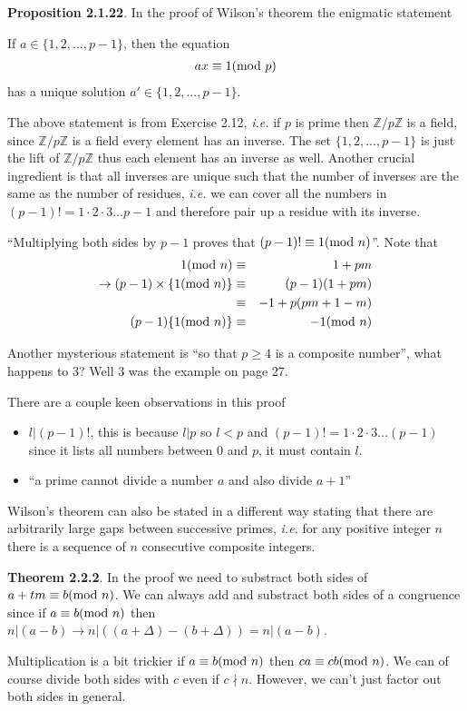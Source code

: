 \documentclass[aps,preprint,preprintnumbers,nofootinbib,showpacs,prd]{revtex4-1}
\newcommand{\ie}{{\it i.e.} }
\newcommand{\bit}{\begin{itemize}}
\newcommand{\eit}{\end{itemize}}
\newcommand{\nbea}{\begin{eqnarray*}}
\newcommand{\neea}{\end{eqnarray*}}
\begin{document}
{\bf Proposition 2.1.22}. In the proof of Wilson's theorem the enigmatic statement

If $a \in \{1, 2, . . . , p - 1\}$, then the equation
%
\nbea
ax \equiv 1 ({\rm mod~} p)
\neea
%
has a unique solution $a' \in \{1, 2, . . . , p - 1\}$. 

The above statement is from Exercise 2.12, \ie if $p$ is prime then $\mathbb{Z}/p\mathbb{Z}$ is a field, since $\mathbb{Z}/p\mathbb{Z}$ is a field every element has an inverse. The set $\{1, 2, . . . , p - 1\}$ is just the lift of $\mathbb{Z}/p\mathbb{Z}$ thus each element has an inverse as well. Another crucial ingredient is that all inverses are unique such that the number of inverses are the same as the number of residues, \ie we can cover all the numbers in $(p-1)! = 1\cdot 2\cdot 3 \dots p-1$ and therefore pair up a residue with its inverse.

``Multiplying both sides by $p-1$ proves that $(p-1)! \equiv 1 ({\rm mod~} n)$''. Note that
%
\nbea
1 ({\rm mod~} n) & \equiv & 1 + pm \\
\to (p-1) \times \{1 ({\rm mod~} n)\} & \equiv & (p-1)(1 + pm) \\
& \equiv & -1 + p(pm + 1 - m) \\
(p-1) \{1 ({\rm mod~} n)\} & \equiv & -1 ({\rm mod~}n)
\neea
%

Another mysterious statement is ``so that $p \ge 4$ is a composite number'', what happens to 3? Well 3 was the example on page 27.

There are a couple keen observations in this proof
\bit
\item $l|(p-1)!$, this is because $l|p$ so $l < p$ and $(p-1)! = 1\cdot 2\cdot 3 \dots (p-1)$ since it lists all numbers between 0 and $p$, it must contain $l$.
\item ``a prime cannot divide a number $a$ and also divide $a+1$''
\eit

Wilson's theorem can also be stated in a different way stating that there are arbitrarily large gaps between successive primes, \ie for any positive integer $n$ there is a sequence of $n$ consecutive composite integers.

{\bf Theorem 2.2.2}. In the proof we need to substract both sides of $a + tm \equiv b ({\rm mod~} n)$. We can always add and substract both sides of a congruence since if $a \equiv b ({\rm mod~} n)$ then $n|(a-b) \to n|((a+\Delta) - (b + \Delta)) = n|(a-b)$.

Multiplication is a bit trickier if $a \equiv b ({\rm mod~}n)$ then $ca \equiv cb ({\rm mod~}n)$. We can of course divide both sides with $c$ even if $c \nmid n$. However, we can't just factor out both sides in general.
\end{document}
